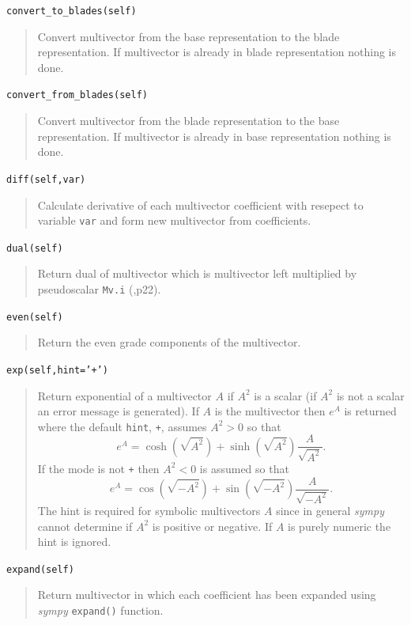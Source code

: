 \documentclass[12pt,twoside,openright]{memoir}
\newcommand{\bfrac}[2]{\displaystyle\frac{#1}{#2}}
\newcommand{\lp}{\left (}
\newcommand{\rp}{\right )}
\newcommand{\f}[2]{{#1}\lp {#2} \rp}
\newcommand{\T}[1]{\texttt{#1}}
\begin{document}
\T{convert\_to\_blades(self)}
\begin{quote}
   Convert multivector from the base representation to the blade representation.
   If multivector is already in blade representation nothing is done.
\end{quote}

\T{convert\_from\_blades(self)}
\begin{quote}
   Convert multivector from the blade representation to the base representation.
   If multivector is already in base representation nothing is done.
\end{quote}

\T{diff(self,var)}
\begin{quote}
   Calculate derivative of each multivector coefficient with resepect to
   variable \T{var} and form new multivector from coefficients.
\end{quote}

\T{dual(self)}
\begin{quote}
   Return dual of multivector which is multivector left multiplied by
   pseudoscalar \T{Mv.i} (\cite{Hestenes},p22).
\end{quote}

\T{even(self)}
\begin{quote}
   Return the even grade components of the multivector.
\end{quote}

\T{exp(self,hint='+')}
\begin{quote}
    Return exponential of a multivector $A$ if $A^{2}$ is a scalar (if $A^{2}$ is not a scalar an 
    error message is generated).  If $A$ is the multivector then $e^{A}$ is returned
    where the default \T{hint}, \T{+}, assumes $A^{2} > 0$ so that 
    \begin{equation*}
    		e^{A} = \f{\cosh}{\sqrt{A^{2}}}+\f{\sinh}{\sqrt{A^{2}}}\bfrac{A}{\sqrt{A^{2}}}.
    \end{equation*}
    If the mode is not \T{+} then $A^{2} < 0$ is assumed so that
    \begin{equation*}
    		e^{A} = \f{\cos}{\sqrt{-A^{2}}}+\f{\sin}{\sqrt{-A^{2}}}\bfrac{A}{\sqrt{-A^{2}}}.
    \end{equation*}
    The hint is required for symbolic multivectors $A$ since in general \emph{sympy} cannot determine if
    $A^{2}$ is positive or negative.  If $A$ is purely numeric the hint is ignored.
\end{quote}

\T{expand(self)}
\begin{quote}
   Return multivector in which each coefficient has been expanded using
   \emph{sympy} \T{expand()} function.
\end{quote}
\end{document}
